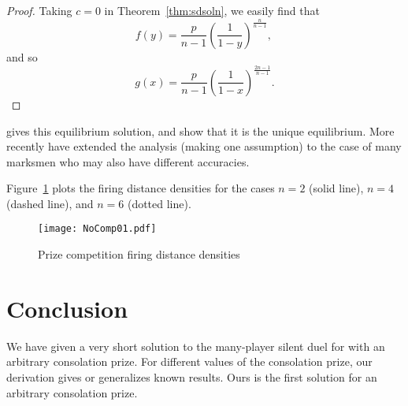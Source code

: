\documentclass[11pt,a4paper]{article}%
\numberwithin{equation}{section}
\theoremstyle{plain}
\begin{document}
%
\begin{proof}
Taking $c=0$ in Theorem~\ref{thm:sdsoln}, we easily find that
\begin{equation*}
f(y) = \frac{p}{n-1} \left( \frac{1}{1 - y} \right)^{\frac{n}{n - 1}} \text{, }%
\end{equation*}%
and so
%
\begin{equation*}
g(x) = \frac{p}{n-1} \left( \frac{1}{1 - x} \right)^{\frac{2n - 1}{n - 1}} \text{.}
\end{equation*}%
\end{proof}
%
\par
\cite{Sakaguchi1978} gives this equilibrium solution, and \cite{HenigONeill1992} show that it is the unique equilibrium. More recently \cite{PresmanSonin2006} have extended the analysis (making one assumption) to the case of many marksmen who may also have different accuracies.
%
\par
Figure~\ref{fig:nocomp} plots the firing distance densities for the cases $n = 2$ (solid line), $n = 4$ (dashed line), and $n = 6$ (dotted line).
%
\begin{figure}[htp]
\centering
\texttt{[image: NoComp01.pdf]}
\caption{Prize competition firing distance densities}
\label{fig:nocomp}
\end{figure}
%
\section{Conclusion}
\label{sec:conclusion}
%
We have given a very short solution to the many-player silent duel for with an arbitrary consolation prize. For different values of the consolation prize, our derivation gives or generalizes known results. Ours is the first solution for an arbitrary consolation prize.
%

%
%
\end{document}
